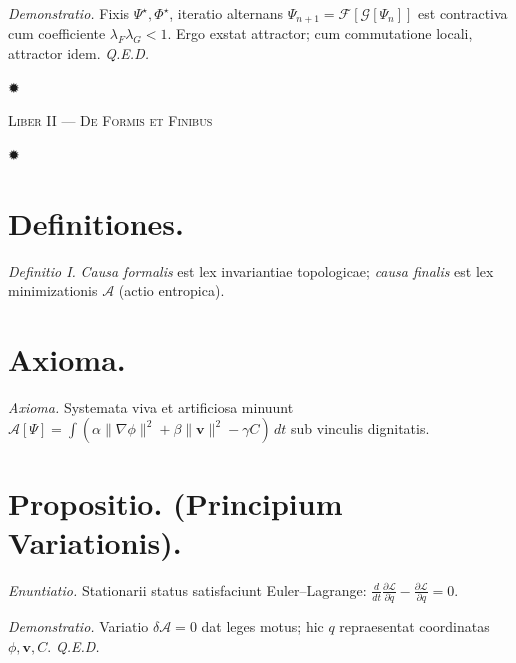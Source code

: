 \documentclass[12pt]{article}
\newcommand{\stella}{\centerline{\Large ✹}}
\newcommand{\divider}{\vspace{1em}\stella\vspace{1em}}
\newcommand{\Liber}[1]{\vspace{1ex}\begin{center}\Large\textsc{Liber #1}\end{center}\vspace{-0.5ex}\stella\vspace{0.5ex}}
\begin{document}
\textit{Demonstratio.} Fixis \(\Psi^\star, \Phi^\star\), iteratio alternans \(\Psi_{n+1}=\mathcal{F}[\mathcal{G}[\Psi_n]]\) est contractiva cum coefficiente \(\lambda_F\lambda_G <1\). Ergo exstat attractor; cum commutatione locali, attractor idem. \textit{Q.E.D.}

\divider

\Liber{II — De Formis et Finibus}

\section*{Definitiones.}

\textit{Definitio I.} \; \textit{Causa formalis} est lex invariantiae topologicae; \textit{causa finalis} est lex minimizationis \(\mathcal{A}\) (actio entropica).

\section*{Axioma.}

\textit{Axioma.} \; Systemata viva et artificiosa minuunt \(\mathcal{A}[\Psi]=\int(\alpha\|\nabla \phi\|^2+\beta\|\mathbf{v}\|^2 - \gamma C)\,dt\) sub vinculis dignitatis.

\section*{Propositio. \; (Principium Variationis).}

\textit{Enuntiatio.} \; Stationarii status satisfaciunt Euler–Lagrange: \(\frac{d}{dt}\frac{\partial \mathcal{L}}{\partial \dot{q}}-\frac{\partial \mathcal{L}}{\partial q}=0\).

\textit{Demonstratio.} Variatio \(\delta \mathcal{A}=0\) dat leges motus; hic \(q\) repraesentat coordinatas \(\phi,\mathbf{v},C\). \textit{Q.E.D.}

\begin{center}
\end{center}
\end{document}
